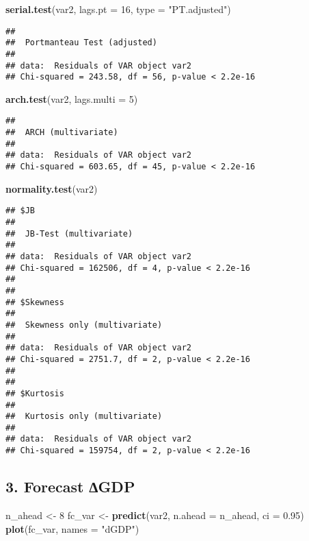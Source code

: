 \documentclass[
]{article}
\newenvironment{Shaded}{\begin{snugshade}}{\end{snugshade}}
\newcommand{\AttributeTok}[1]{\textcolor[rgb]{0.13,0.29,0.53}{#1}}
\newcommand{\DecValTok}[1]{\textcolor[rgb]{0.00,0.00,0.81}{#1}}
\newcommand{\FloatTok}[1]{\textcolor[rgb]{0.00,0.00,0.81}{#1}}
\newcommand{\FunctionTok}[1]{\textcolor[rgb]{0.13,0.29,0.53}{\textbf{#1}}}
\newcommand{\NormalTok}[1]{#1}
\newcommand{\OtherTok}[1]{\textcolor[rgb]{0.56,0.35,0.01}{#1}}
\newcommand{\StringTok}[1]{\textcolor[rgb]{0.31,0.60,0.02}{#1}}
\begin{document}
\begin{Shaded}
\begin{Highlighting}[]
\FunctionTok{serial.test}\NormalTok{(var2, }\AttributeTok{lags.pt =} \DecValTok{16}\NormalTok{, }\AttributeTok{type =} \StringTok{"PT.adjusted"}\NormalTok{)}
\end{Highlighting}
\end{Shaded}

\begin{verbatim}
## 
##  Portmanteau Test (adjusted)
## 
## data:  Residuals of VAR object var2
## Chi-squared = 243.58, df = 56, p-value < 2.2e-16
\end{verbatim}

\begin{Shaded}
\begin{Highlighting}[]
\FunctionTok{arch.test}\NormalTok{(var2, }\AttributeTok{lags.multi =} \DecValTok{5}\NormalTok{)}
\end{Highlighting}
\end{Shaded}

\begin{verbatim}
## 
##  ARCH (multivariate)
## 
## data:  Residuals of VAR object var2
## Chi-squared = 603.65, df = 45, p-value < 2.2e-16
\end{verbatim}

\begin{Shaded}
\begin{Highlighting}[]
\FunctionTok{normality.test}\NormalTok{(var2)}
\end{Highlighting}
\end{Shaded}

\begin{verbatim}
## $JB
## 
##  JB-Test (multivariate)
## 
## data:  Residuals of VAR object var2
## Chi-squared = 162506, df = 4, p-value < 2.2e-16
## 
## 
## $Skewness
## 
##  Skewness only (multivariate)
## 
## data:  Residuals of VAR object var2
## Chi-squared = 2751.7, df = 2, p-value < 2.2e-16
## 
## 
## $Kurtosis
## 
##  Kurtosis only (multivariate)
## 
## data:  Residuals of VAR object var2
## Chi-squared = 159754, df = 2, p-value < 2.2e-16
\end{verbatim}

\hypertarget{forecast-gdp}{%
\subsection{3. Forecast ∆GDP}\label{forecast-gdp}}

\begin{Shaded}
\begin{Highlighting}[]
\NormalTok{n\_ahead }\OtherTok{\textless{}{-}} \DecValTok{8}
\NormalTok{fc\_var  }\OtherTok{\textless{}{-}} \FunctionTok{predict}\NormalTok{(var2, }\AttributeTok{n.ahead =}\NormalTok{ n\_ahead, }\AttributeTok{ci =} \FloatTok{0.95}\NormalTok{)}
\FunctionTok{plot}\NormalTok{(fc\_var, }\AttributeTok{names =} \StringTok{"dGDP"}\NormalTok{)}
\end{Highlighting}
\end{Shaded}
\end{document}
